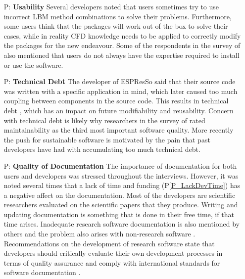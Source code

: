 \documentclass[final, 3p, times, authoryear]{elsarticle}
\newcounter{pnum} %
\newcommand{\ppref}[1]{P\ref{#1}}
\begin{document}
\begin{enumerate}
	\item[P\refstepcounter{pnum}\thepnum \label{P_Usability}:]
	\textbf{Usability} Several developers noted that users sometimes try to use
	incorrect LBM method combinations to solve their problems. Furthermore, some
	users think that the packages will work out of the box to solve their cases,
	while in reality CFD knowledge needs to be applied to correctly modify the
	packages for the new endeavour.  Some of the respondents in the survey of
	\citep{WieseEtAl2019} also mentioned that users do not always have the
	expertise required to install or use the software.
	
	\item[P\refstepcounter{pnum}\thepnum \label{P_TechDebt}:] \textbf{Technical
	Debt} The developer of ESPResSo said that their source code was written with
	a specific application in mind, which later caused too much coupling between
	components in the source code. This results in technical debt
	\citet{KruchtenEtAl2012}, which has an impact on future modifiability and
	reusability. Concern with technical debt is likely why researchers in the
	survey of \citep{Nguyen-HoanEtAl2010} rated maintainability as the third
	most important software quality. More recently the push for sustainable
	software \citet{deSouzaEtAl2019} is motivated by the pain that past
	developers have had with accumulating too much technical debt.

	\item[P\refstepcounter{pnum}\thepnum \label{P_Documentation}:]
	\textbf{Quality of Documentation}  The importance of documentation for both
	users and developers was stressed throughout the interviews. However, it was
	noted several times that a lack of time and funding (\ppref{P_LackDevTime})
	has a negative affect on the documentation. Most of the developers are
	scientific researchers evaluated on the scientific papers that they produce.
	Writing and updating documentation is something that is done in their free
	time, if that time arises. Inadequate research software documentation is
	also mentioned by others \citep{PintoEtAl2018, WieseEtAl2019} and the
	problem also arises with non-research software \citep{LethbridgeEtAl2003}.
	Recommendations on the development of research software state that
	developers should critically evaluate their own development processes in
	terms of quality assurance and comply with international standards for
	software documentation \citep{KaterbowAndFeulner2018}.

\end{enumerate}
\end{document}
